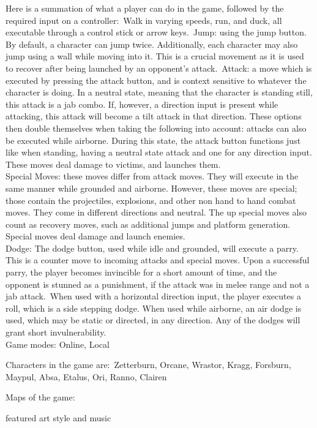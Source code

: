 \documentclass[11pt]{article}
\begin{document}
Here is a summation of what a player can do in the game, followed by the required input on a controller:\
Walk in varying speeds, run, and duck, all executable through a control stick or arrow keys.\
Jump: using the jump button. By default, a character can jump twice. Additionally, each character may also jump using a wall while moving into it. This is a crucial movement as it is used to recover after being launched by an opponent's attack.\
Attack: a move which is executed by pressing the attack button, and is context sensitive to whatever the character is doing. In a neutral state, meaning that the character is standing still, this attack is a jab combo. If, however, a direction input is present while attacking, this attack will become a tilt attack in that direction. These options then double themselves when taking the following into account: attacks can also be executed while airborne. During this state, the attack button functions just like when standing, having a neutral state attack and one for any direction input. These moves deal damage to victims, and launches them.\\
Special Moves: these moves differ from attack moves. They will execute in the same manner while grounded and airborne. However, these moves are special; those contain the projectiles, explosions, and other non hand to hand combat moves. They come in different directions and neutral. The up special moves also count as recovery moves, such as additional jumps and platform generation. Special moves deal damage and launch enemies.\\
Dodge: The dodge button, used while idle and grounded, will execute a parry. This is a counter move to incoming attacks and special moves. Upon a successful parry, the player becomes invincible for a short amount of time, and the opponent is stunned as a punishment, if the attack was in melee range and not a jab attack.\
When used with a horizontal direction input, the player executes a roll, which is a side stepping dodge. When used while airborne, an air dodge is used, which may be static or directed, in any direction. Any of the dodges will grant short invulnerability.\\



Game modes: Online, Local\ %


Characters in the game are:\
Zetterburn, Orcane, Wrastor, Kragg, Forsburn, Maypul, Absa, Etalus, Ori, Ranno, Clairen %

Maps of the game: \ %

featured art style and music\\ %

{}

\end{document}

